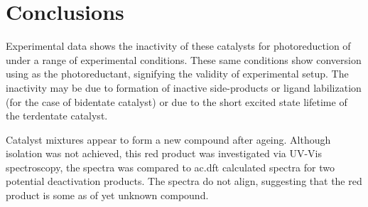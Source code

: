 \section{Conclusions}

Experimental data shows the inactivity of these catalysts for photoreduction of  under a range of experimental conditions. These same conditions show conversion using  as the photoreductant, signifying the validity of experimental setup. The inactivity may be due to formation of inactive side-products or ligand labilization (for the case of bidentate catalyst) or due to the short excited state lifetime of the terdentate catalyst. 

Catalyst mixtures appear to form a new compound after ageing. Although isolation was not achieved, this red product was investigated via UV-Vis spectroscopy, the spectra was compared to \gls{ac.dft} calculated spectra for two potential deactivation products. The spectra do not align, suggesting that the red product is some as of yet unknown compound. 
